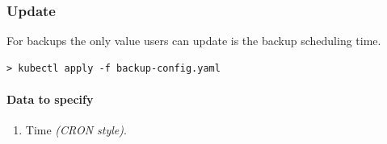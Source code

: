 \subsubsection*{Update}

For backups the only value users can update is the backup 
scheduling time.

\begin{lstlisting}
> kubectl apply -f backup-config.yaml
\end{lstlisting}

\paragraph{Data to specify}
\begin{enumerate}
    \item Time \textit{(CRON style)}.
\end{enumerate}

